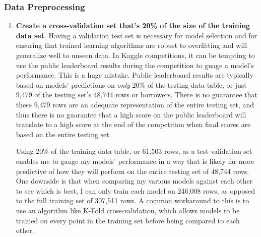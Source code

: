 \documentclass[12pt, letterpaper]{article}
\begin{document}
\subsubsection{Data Preprocessing}
\begin{enumerate}
  \item \textbf{Create a cross-validation set that's 20\% of the size of the training data set}. Having a validation test set is necessary for model selection and for ensuring that trained learning algorithms are robust to overfitting and will generalize well to unseen data. In Kaggle competitions, it can be tempting to use the public leaderboard results during the competition to guage a model's performance. This is a huge mistake. Public leaderboard results are typically based on models' predictions on \textit{only} 20\% of the testing data table, or just 9,479 of the testing set's 48,744 rows or borrowers. There is no guarantee that these 9,479 rows are an adequate representation of the entire testing set, and thus there is no guarantee that a high score on the public leaderboard will translate to a high score at the end of the competition when final scores are based on the entire testing set.

  Using 20\% of the training data table, or 61,503 rows, as a test validation set enables me to gauge my models' performance in a way that is likely far more predictive of how they will perform on the entire testing set of 48,744 rows. One downside is that when comparing my various models against each other to see which is best, I can only train each model on 246,008 rows, as opposed to the full training set of 307,511 rows. A common workaround to this is to use an algorithm like K-Fold cross-validation, which allows models to be trained on every point in the training set before being compared to each other.


\end{enumerate}
\end{document}
